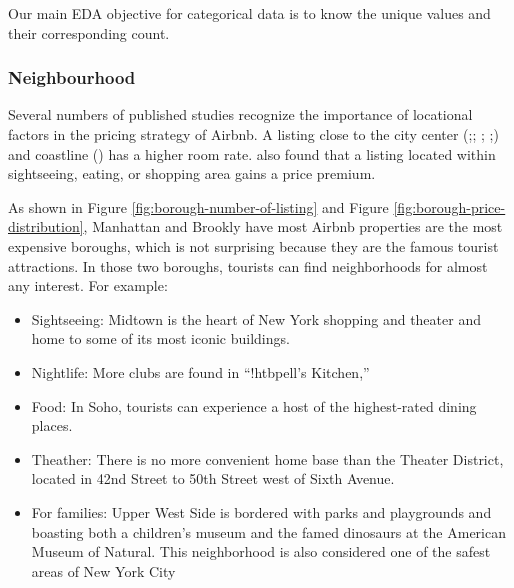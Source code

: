 Our main EDA objective for categorical data is to know the unique values and
their corresponding count.

\subsubsection*{Neighbourhood}
\label{eda:neighbourhood}

Several numbers of published studies recognize the importance of locational
factors in the pricing strategy of Airbnb.  A listing close to the city center
(\cite{gibbs2018use};\cite{li2016pros}; \cite{wang2017price};
\cite{zhang2017key};\cite{gibbs2018use}) and coastline (\cite{perez2018and}) has
a higher room rate.  \cite{perez2018and} also found that a listing located
within sightseeing, eating, or shopping area gains a price premium.

As shown in Figure \ref{fig:borough-number-of-listing} and Figure
\ref{fig:borough-price-distribution}, Manhattan and Brookly have most Airbnb
properties are the most expensive boroughs, which is not surprising because they
are the famous tourist attractions.  In those two boroughs, tourists can find
neighborhoods for almost any interest. For example:

\begin{itemize}
  \item Sightseeing: Midtown is the heart of New York shopping and theater and
    home to some of its most iconic buildings.
  \item Nightlife:  More clubs are found in “!htbpell’s Kitchen,”
  \item Food: In Soho, tourists can experience a host of the highest-rated
    dining places.
  \item Theather: There is no more convenient home base than
    the Theater District,  located in 42nd Street to 50th Street west of Sixth
    Avenue.
  \item For families: Upper West Side is bordered with parks and playgrounds and
  boasting both a children’s museum and the famed dinosaurs at the American Museum
  of Natural. This neighborhood is also considered one of the safest areas of New
  York City
\end{itemize}



